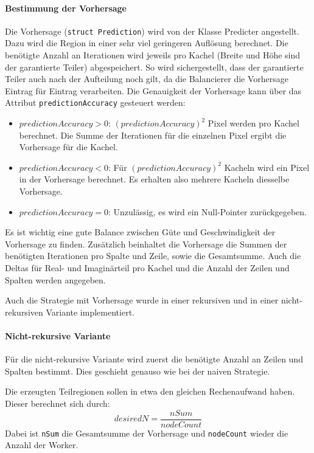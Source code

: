 \paragraph*{Bestimmung der Vorhersage}
Die Vorhersage (\verb|struct Prediction|) wird von der Klasse Predicter angestellt.
Dazu wird die Region in einer sehr viel geringeren Auflösung berechnet.
Die benötigte Anzahl an Iterationen wird jeweils pro Kachel (Breite und Höhe sind der garantierte Teiler) abgespeichert.
So wird sichergestellt, dass der garantierte Teiler auch nach der Aufteilung noch gilt, da die Balancierer die Vorhersage Eintrag für Eintrag verarbeiten.
Die Genauigkeit der Vorhersage kann über das Attribut \verb|predictionAccuracy| gesteuert werden:
\begin{itemize}
	\item $predictionAccuracy > 0$: $(predictionAccuracy)^2$ Pixel werden pro Kachel berechnet. Die Summe der Iterationen für die einzelnen Pixel ergibt die Vorhersage für die Kachel.
	\item $predictionAccuracy < 0$: Für $(predictionAccuracy)^2$ Kacheln wird ein Pixel in der Vorhersage berechnet. Es erhalten also mehrere Kacheln diesselbe Vorhersage.
	\item $predictionAccuracy = 0$: Unzulässig, es wird ein Null-Pointer zurückgegeben.
\end{itemize}
Es ist wichtig eine gute Balance zwischen Güte und Geschwindigkeit der Vorhersage zu finden.
Zusätzlich beinhaltet die Vorhersage die Summen der benötigten Iterationen pro Spalte und Zeile, sowie die Gesamtsumme.
Auch die Deltas für Real- und Imaginärteil pro Kachel und die Anzahl der Zeilen und Spalten werden angegeben.

Auch die Strategie mit Vorhersage wurde in einer rekursiven und in einer nicht-rekursiven Variante implementiert.

\paragraph*{Nicht-rekursive Variante}\label{lastbalancierung_vorhersage}
Für die nicht-rekursive Variante wird zuerst die benötigte Anzahl an Zeilen und Spalten bestimmt.
Dies geschieht genauso wie bei der naiven Strategie.

Die erzeugten Teilregionen sollen in etwa den gleichen Rechenaufwand haben. Dieser berechnet sich durch:
\begin{equation}\label{lastbalancierung_vorhersage_formel}
	desiredN = \frac{nSum}{nodeCount}
\end{equation}
Dabei ist \verb|nSum| die Gesamtsumme der Vorhersage und \verb|nodeCount| wieder die Anzahl der Worker.


